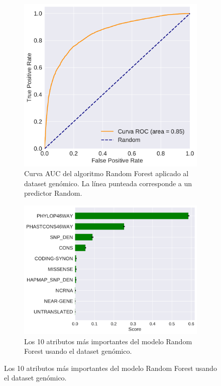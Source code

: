 \begin{figure}[H]
\centering
\begin{subfigure}[b]{0.8\textwidth}
    \centering
    \includegraphics[width=\textwidth]{documents/latex/figures/3/genomic/auc_genomic.pdf}
    \caption{Curva AUC del algoritmo Random Forest aplicado al dataset genómico. La línea punteada corresponde a un predictor Random.}
    \label{fig:auc_genomic}
\end{subfigure}

\hfill
\hfill

\begin{subfigure}[b]{\textwidth}
    \centering
    \includegraphics[width=\textwidth]{documents/latex/figures/3/genomic/importances_genomic.pdf}
    \caption{Los 10 atributos más importantes del modelo Random Forest usando el dataset genómico.}
    \label{fig:importances_genomic}
\end{subfigure}

\end{figure}


